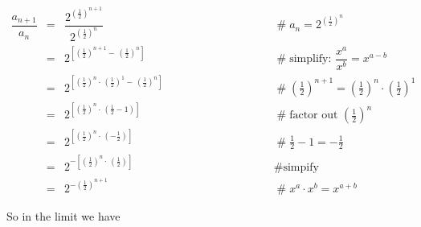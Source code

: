 \documentclass{article}
\theoremstyle{definition}
\begin{document}
\begin{equation*}
\begin{array}{llll}
\dfrac{a_{n+1}}{a_n}
&=&  \dfrac{2^{{ \left ( \tfrac{1}{2} \right ) }^{n+1}}} {2^{{ \left (\tfrac{1}{2} \right )}^n}} 
				&\quad \qquad \qquad \qquad \qquad \mathrel{\#} a_n = 2^{{\left (\tfrac{1}{2} \right )}^n} \\
[20pt]
&=& 2^{\left [{ \left (\tfrac{1}{2} \right )}^{n+1} - \, {\left (\tfrac{1}{2} \right )}^n \right ] }
				&\quad \qquad \qquad \qquad \qquad \mathrel{\#} \text{simplify: $\dfrac{x^a}{x^b} = x^{a-b}$} \\
[10pt]
&=& 2^{\left [ { \left (\tfrac{1}{2} \right )}^{n} \cdot \,  {\left (\tfrac{1}{2} \right )}^{1}  -\, {{ \left ( \tfrac{1}{2} \right )}^n}\right ] }
				&\quad \qquad \qquad \qquad \qquad \mathrel{\#} {\left (\tfrac{1}{2} \right )}^{n+1} = {\left (\tfrac{1}{2}\right )}^{n} \cdot {\left (\tfrac{1}{2}\right )}^{1}  \\
[10pt]
&=& 2^{\left [ {\left (\tfrac{1}{2} \right )}^{n} \cdot \,  \left ( \tfrac{1}{2} -1 \right ) \right ]} 
				&\quad \qquad \qquad \qquad \qquad \mathrel{\#} \text{factor out ${\left (\tfrac{1}{2} \right )}^n$} \\
[10pt]
&=& 2^{\left [ { \left (\tfrac{1}{2} \right )}^{n} \cdot \, \left ( - \tfrac{1}{2} \right ) \right ]} 
				&\quad \qquad \qquad \qquad \qquad \mathrel{\#} \tfrac{1}{2} - 1 = - \tfrac{1}{2}  \\
[10pt]
&=& 2^{- \left [ { \left (\tfrac{1}{2} \right )}^{n} \cdot  \, \left (\tfrac{1}{2} \right ) \right ]} 
				&\quad \qquad \qquad \qquad \qquad \mathrel{\#} \text{simpify}  \\
[10pt]
&=& 2^{- {\left (\tfrac{1}{2} \right )}^{n+1}}
				&\quad \qquad \qquad \qquad \qquad \mathrel{\#} x^a \cdot x^b = x^{a+b}
\end{array}
\end{equation*}


\bigskip
\noindent
So in the limit we have 
\end{document}
